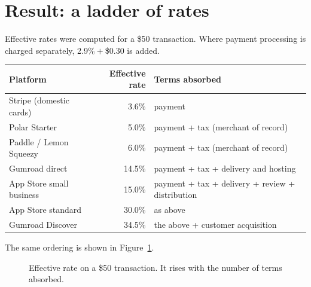 \section{Result: a ladder of rates}

Effective rates were computed for a \$50 transaction. Where payment processing is charged
separately, 2.9\%${}+{}$\$0.30 is added.

\begin{center}
\begin{tabularx}{\textwidth}{@{}lrX@{}}
\toprule
Platform & Effective rate & Terms absorbed \\
\midrule
Stripe (domestic cards) & 3.6\% & payment \\
Polar Starter & 5.0\% & payment + tax (merchant of record) \\
Paddle / Lemon Squeezy & 6.0\% & payment + tax (merchant of record) \\
Gumroad direct & 14.5\% & payment + tax + delivery and hosting \\
App Store small business & 15.0\% & payment + tax + delivery + review + distribution \\
App Store standard & 30.0\% & as above \\
Gumroad Discover & 34.5\% & the above + customer acquisition \\
\bottomrule
\end{tabularx}
\label{tab:fee-ladder}
\end{center}

The same ordering is shown in Figure~\ref{fig:platform-ladder}.

\begin{figure}[htbp]
\centering
{}
\caption{Effective rate on a \$50 transaction. It rises with the number of terms absorbed.}
\label{fig:platform-ladder}
\end{figure}

